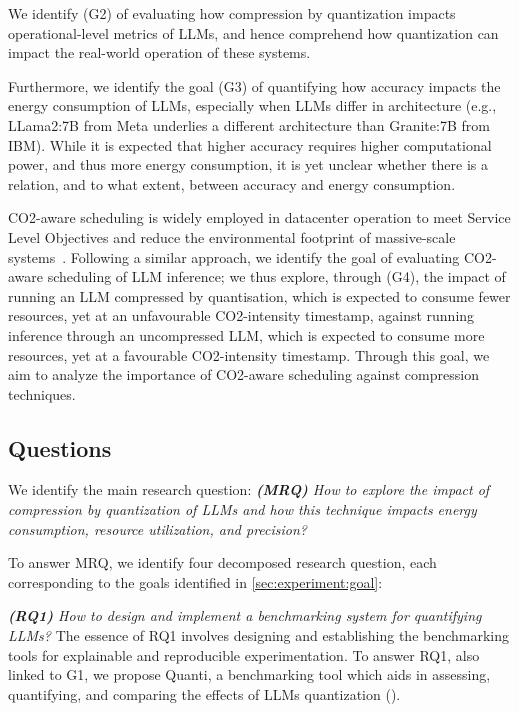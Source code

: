 We identify (G2) of evaluating how compression by quantization impacts operational-level metrics of LLMs, and hence comprehend how quantization can impact the real-world operation of these systems. 

Furthermore, we identify the goal 
(G3) of quantifying how accuracy impacts the energy consumption of LLMs, especially when LLMs differ in architecture (e.g., LLama2:7B from Meta underlies a different architecture than Granite:7B from IBM). While it is expected that higher accuracy requires higher computational power, and thus more energy consumption, it is yet unclear whether there is a relation, and to what extent, between accuracy and energy consumption. 

CO2-aware scheduling is widely employed in datacenter operation to meet Service Level Objectives and reduce the environmental footprint of massive-scale systems~\cite{DBLP:journals/corr/abs-2206-03259, nicolae5377101m3sa, DBLP:conf/wosp/NiewenhuisTIM24}. Following a similar approach, we identify the goal of evaluating CO2-aware scheduling of LLM inference; we thus explore, through (G4), the impact of running an LLM compressed by quantisation, which is expected to consume fewer resources, yet at an unfavourable CO2-intensity timestamp, against running inference through an uncompressed LLM, which is expected to consume more resources, yet at a favourable CO2-intensity timestamp. Through this goal, we aim to analyze the importance of CO2-aware scheduling against compression techniques.


\subsection{Questions}\label{sec:experiment:questions}

We identify the main research question: \textit{\textbf{(MRQ)} How to explore the impact of compression by quantization of LLMs and how this technique impacts energy consumption, resource utilization, and precision?}

To answer MRQ, we identify four decomposed research question, each corresponding to the goals identified in \ref{sec:experiment:goal}:

\textit{\textbf{(RQ1)} How to design and implement a benchmarking system for quantifying LLMs?} The essence of RQ1 involves designing and establishing the benchmarking tools for explainable and reproducible experimentation. To answer RQ1, also linked to G1, we propose Quanti, a benchmarking tool which aids in assessing, quantifying, and comparing the effects of LLMs quantization ().

